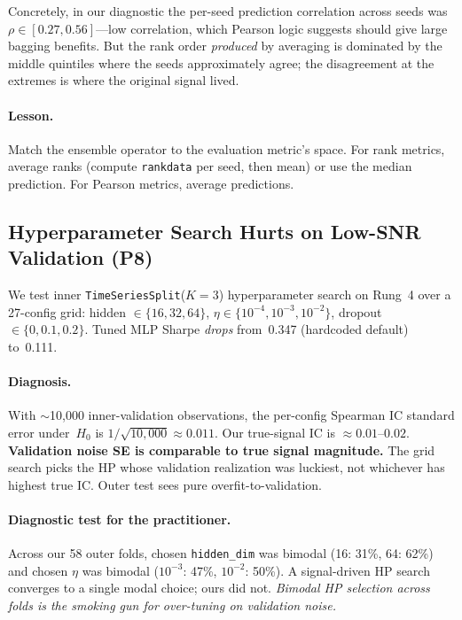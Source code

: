 \documentclass[11pt]{article}
\begin{document}
Concretely, in our diagnostic the per-seed prediction correlation across
seeds was $\rho\in[0.27, 0.56]$---low correlation, which Pearson logic
suggests should give large bagging benefits. But the rank order
\emph{produced} by averaging is dominated by the middle quintiles where
the seeds approximately agree; the disagreement at the extremes is
where the original signal lived.

\paragraph{Lesson.}
Match the ensemble operator to the evaluation metric's space. For
rank metrics, average ranks (compute \texttt{rankdata} per seed, then
mean) or use the median prediction. For Pearson metrics, average
predictions.

\subsection{Hyperparameter Search Hurts on Low-SNR Validation (P8)}\label{subsec:hp-fail}

We test inner \texttt{TimeSeriesSplit}($K{=}3$) hyperparameter search
on Rung~4 over a 27-config grid: hidden $\in\{16,32,64\}$,
$\eta\in\{10^{-4}, 10^{-3}, 10^{-2}\}$, dropout $\in\{0, 0.1, 0.2\}$.
Tuned MLP Sharpe \emph{drops} from~0.347 (hardcoded default) to~0.111.

\paragraph{Diagnosis.}
With $\sim$10{,}000 inner-validation observations, the per-config
Spearman IC standard error under~$H_0$ is
$1/\sqrt{10{,}000} \approx 0.011$. Our true-signal IC is $\approx
0.01$--$0.02$. \textbf{Validation noise SE is comparable to true signal
magnitude.} The grid search picks the HP whose validation realization
was luckiest, not whichever has highest true IC. Outer test sees pure
overfit-to-validation.

\paragraph{Diagnostic test for the practitioner.}
Across our 58 outer folds, chosen \texttt{hidden\_dim} was bimodal
(16: 31\%, 64: 62\%) and chosen $\eta$ was bimodal ($10^{-3}$: 47\%,
$10^{-2}$: 50\%). A signal-driven HP search converges to a single
modal choice; ours did not. \emph{Bimodal HP selection across folds
is the smoking gun for over-tuning on validation noise.}
\end{document}
